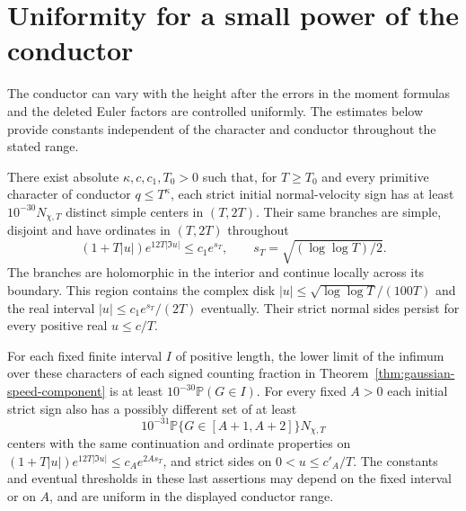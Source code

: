 \section{Uniformity for a small power of the conductor}
\label{sec:uniform-deformation}
The conductor can vary with the height after the errors in the moment
formulas and the deleted Euler factors are controlled uniformly.
The estimates below provide constants independent of the character
and conductor throughout the stated range.

\begin{theorem}\label{thm:uniform-deformation}
There exist absolute $\kappa,c,c_1,T_0>0$ such that, for $T\ge T_0$
and every primitive character of conductor $q\le T^\kappa$, each
strict initial normal-velocity sign has at least
$10^{-30}N_{\chi,T}$ distinct simple centers in $(T,2T)$.
Their same branches are simple, disjoint and have ordinates in
$(T,2T)$ throughout
\[
                  (1+T|u|)e^{12T|\Im u|}\le c_1e^{s_T},
              \qquad s_T=\sqrt{(\log\log T)/2}.
\]
The branches are holomorphic in the interior and continue locally
across its boundary. This region contains the complex disk
$|u|\le\sqrt{\log\log T}/(100T)$ and the real interval
$|u|\le c_1e^{s_T}/(2T)$ eventually. Their strict normal sides persist
for every positive real $u\le c/T$.

For each fixed finite interval $I$ of positive length, the lower limit
of the infimum over these characters of each signed counting
fraction in Theorem~\ref{thm:gaussian-speed-component} is at least
$10^{-30}\mathbb P(G\in I)$. For every fixed $A>0$ each initial
strict sign also has a possibly different set of at least
\[
               10^{-31}\mathbb P\{G\in[A+1,A+2]\}N_{\chi,T}
\]
centers with the same continuation and ordinate properties on
$(1+T|u|)e^{12T|\Im u|}\le c_Ae^{2As_T}$, and strict sides on
$0<u\le c'_A/T$. The constants and eventual thresholds in these
last assertions may depend on the fixed interval or on $A$, and are
uniform in the displayed conductor range.
\end{theorem}

